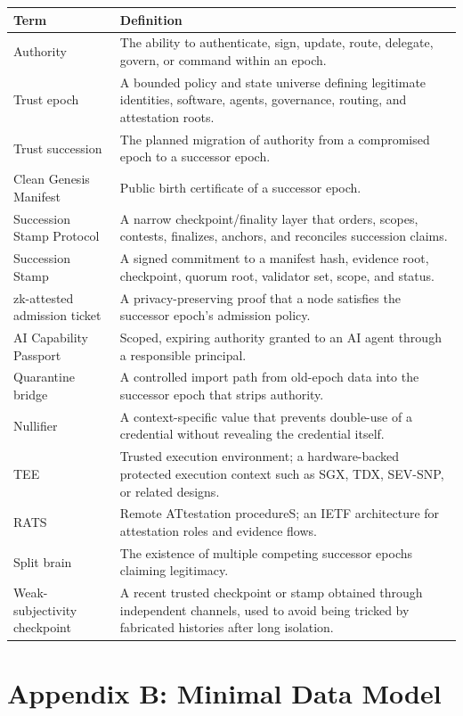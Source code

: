 \documentclass[11pt,letterpaper]{article}
\begin{document}
\begin{longtable}{p{}p{}}
\toprule
\textbf{Term} & \textbf{Definition} \\
\midrule
Authority & The ability to authenticate, sign, update, route, delegate, govern, or command within an epoch. \\
Trust epoch & A bounded policy and state universe defining legitimate identities, software, agents, governance, routing, and attestation roots. \\
Trust succession & The planned migration of authority from a compromised epoch to a successor epoch. \\
Clean Genesis Manifest & Public birth certificate of a successor epoch. \\
Succession Stamp Protocol & A narrow checkpoint/finality layer that orders, scopes, contests, finalizes, anchors, and reconciles succession claims. \\
Succession Stamp & A signed commitment to a manifest hash, evidence root, checkpoint, quorum root, validator set, scope, and status. \\
zk-attested admission ticket & A privacy-preserving proof that a node satisfies the successor epoch's admission policy. \\
AI Capability Passport & Scoped, expiring authority granted to an AI agent through a responsible principal. \\
Quarantine bridge & A controlled import path from old-epoch data into the successor epoch that strips authority. \\
Nullifier & A context-specific value that prevents double-use of a credential without revealing the credential itself. \\
TEE & Trusted execution environment; a hardware-backed protected execution context such as SGX, TDX, SEV-SNP, or related designs. \\
RATS & Remote ATtestation procedureS; an IETF architecture for attestation roles and evidence flows. \\
Split brain & The existence of multiple competing successor epochs claiming legitimacy. \\
Weak-subjectivity checkpoint & A recent trusted checkpoint or stamp obtained through independent channels, used to avoid being tricked by fabricated histories after long isolation. \\
\bottomrule
\end{longtable}

\section{Appendix B: Minimal Data Model}
\end{document}
